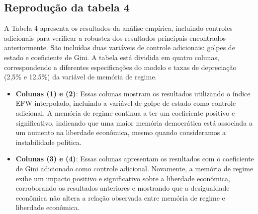 \begin{table}
	\caption{Tabela 3 do Artigo Original - Resultados principais.}
	\label{tab:tabela3}
	\scriptsize
	\end{table}


	\subsection{Reprodução da tabela 4 }

	A Tabela 4 apresenta os resultados da análise empírica, incluindo controles adicionais para verificar a robustez dos resultados principais encontrados anteriormente. São incluídas duas variáveis de controle adicionais: golpes de estado e coeficiente de Gini. A tabela está dividida em quatro colunas, correspondendo a diferentes especificações do modelo e taxas de depreciação (2,5\% e 12,5\%) da variável de memória de regime.

	\begin{itemize}
		\item \textbf{Colunas (1) e (2)}: Essas colunas mostram os resultados utilizando o índice EFW interpolado, incluindo a variável de golpe de estado como controle adicional. A memória de regime continua a ter um coeficiente positivo e significativo, indicando que uma maior memória democrática está associada a um aumento na liberdade econômica, mesmo quando consideramos a instabilidade política.
		\item \textbf{Colunas (3) e (4)}: Essas colunas apresentam os resultados com o coeficiente de Gini adicionado como controle adicional. Novamente, a memória de regime exibe um impacto positivo e significativo sobre a liberdade econômica, corroborando os resultados anteriores e mostrando que a desigualdade econômica não altera a relação observada entre memória de regime e liberdade econômica.
	\end{itemize}
	
